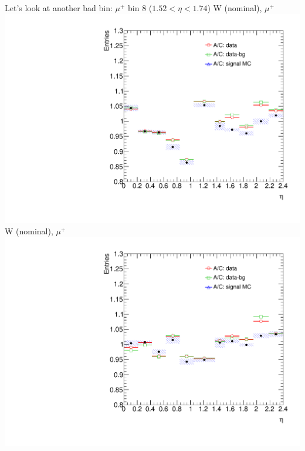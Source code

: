  {
Let's look at another bad bin: $\mu^{+}$ bin 8 ($1.52<\eta<1.74$)
}
 {
\colb[T]
\centering
\small{ W (nominal), $\mu^{+}$}
\includegraphics[width=1.0\textwidth]{dates/20130306/figures/both/W_NOM_Q0_stack_d3_eta_lpt_met_y_2__1_z_0__1_POS}
\centering
\small{ W (nominal), $\mu^{+}$}
\includegraphics[width=1.0\textwidth]{dates/20130306/figures/both/W_NOM_Q0_stack_d3_eta_lpt_met_y_2__1_z_0__1_NEG}
\cole
}
